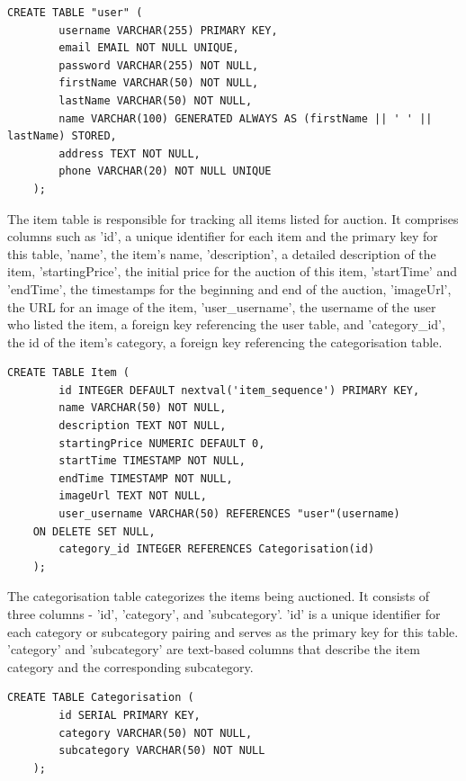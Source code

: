 \vspace{0.2cm}
\begin{lstlisting}[style=sqlStyle]
	CREATE TABLE "user" (
		username VARCHAR(255) PRIMARY KEY,
		email EMAIL NOT NULL UNIQUE,
		password VARCHAR(255) NOT NULL,
		firstName VARCHAR(50) NOT NULL,
		lastName VARCHAR(50) NOT NULL,
		name VARCHAR(100) GENERATED ALWAYS AS (firstName || ' ' || lastName) STORED,
		address TEXT NOT NULL,
		phone VARCHAR(20) NOT NULL UNIQUE
	);
\end{lstlisting}
\vspace{0.2cm}

The item table is responsible for tracking all items listed for auction. It comprises columns such as 'id', a unique identifier for each item and the primary key for this table, 'name', the item's name, 'description', a detailed description of the item, 'startingPrice', the initial price for the auction of this item, 'startTime' and 'endTime', the timestamps for the beginning and end of the auction, 'imageUrl', the URL for an image of the item, 'user\_username', the username of the user who listed the item, a foreign key referencing the user table, and 'category\_id', the id of the item's category, a foreign key referencing the categorisation table.
\clearpage

\vspace{0.2cm}
\begin{lstlisting}[style=sqlStyle]
	CREATE TABLE Item (
		id INTEGER DEFAULT nextval('item_sequence') PRIMARY KEY,
		name VARCHAR(50) NOT NULL,
		description TEXT NOT NULL,
		startingPrice NUMERIC DEFAULT 0,
		startTime TIMESTAMP NOT NULL,
		endTime TIMESTAMP NOT NULL,
		imageUrl TEXT NOT NULL,
		user_username VARCHAR(50) REFERENCES "user"(username)
	ON DELETE SET NULL,
		category_id INTEGER REFERENCES Categorisation(id)
	);
\end{lstlisting}
\vspace{0.2cm}

The categorisation table categorizes the items being auctioned. It consists of three columns - 'id', 'category', and 'subcategory'. 'id' is a unique identifier for each category or subcategory pairing and serves as the primary key for this table. 'category' and 'subcategory' are text-based columns that describe the item category and the corresponding subcategory.

\vspace{0.2cm}
\begin{lstlisting}[style=sqlStyle]
	CREATE TABLE Categorisation (
		id SERIAL PRIMARY KEY,
		category VARCHAR(50) NOT NULL,
		subcategory VARCHAR(50) NOT NULL
	);
\end{lstlisting}
\vspace{0.2cm}

